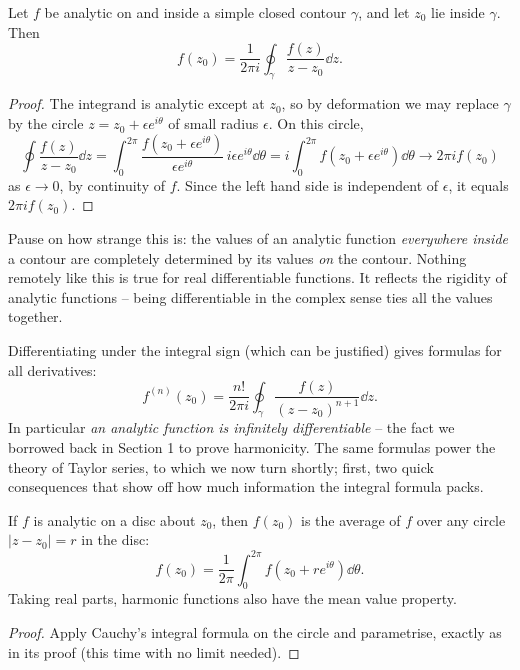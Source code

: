 \begin{theorem}
	Let $f$ be analytic on and inside a simple closed contour $\gamma$, and let $z_0$ lie inside $\gamma$. Then
	$$
	f(z_0) = \frac{1}{2\pi i} \oint_\gamma \frac{f(z)}{z - z_0} \dd z.
	$$
\end{theorem}
\begin{proof}
	The integrand is analytic except at $z_0$, so by deformation we may replace $\gamma$ by the circle $z = z_0 + \epsilon e^{i\theta}$ of small radius $\epsilon$. On this circle,
	$$
	\oint \frac{f(z)}{z - z_0} \dd z = \int_0^{2\pi} \frac{f(z_0 + \epsilon e^{i\theta})}{\epsilon e^{i\theta}} \, i\epsilon e^{i\theta} \dd \theta = i \int_0^{2\pi} f(z_0 + \epsilon e^{i\theta}) \dd \theta \to 2\pi i f(z_0)
	$$
	as $\epsilon \to 0$, by continuity of $f$. Since the left hand side is independent of $\epsilon$, it equals $2\pi i f(z_0)$.
\end{proof}

Pause on how strange this is: the values of an analytic function \emph{everywhere inside} a contour are completely determined by its values \emph{on} the contour. Nothing remotely like this is true for real differentiable functions. It reflects the rigidity of analytic functions -- being differentiable in the complex sense ties all the values together.

Differentiating under the integral sign (which can be justified) gives formulas for all derivatives:
$$
f^{(n)}(z_0) = \frac{n!}{2\pi i} \oint_\gamma \frac{f(z)}{(z - z_0)^{n + 1}} \dd z.
$$
In particular \emph{an analytic function is infinitely differentiable} -- the fact we borrowed back in Section 1 to prove harmonicity. The same formulas power the theory of Taylor series, to which we now turn shortly; first, two quick consequences that show off how much information the integral formula packs.

\begin{proposition}
	If $f$ is analytic on a disc about $z_0$, then $f(z_0)$ is the average of $f$ over any circle $|z - z_0| = r$ in the disc:
	$$
	f(z_0) = \frac{1}{2\pi} \int_0^{2\pi} f(z_0 + re^{i\theta}) \dd \theta.
	$$
	Taking real parts, harmonic functions also have the mean value property.
\end{proposition}
\begin{proof}
	Apply Cauchy's integral formula on the circle and parametrise, exactly as in its proof (this time with no limit needed).
\end{proof}

